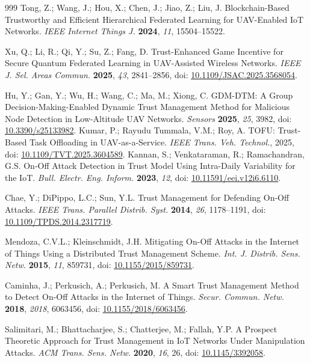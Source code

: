 \documentclass[notspecified,article,submit,moreauthors]{Definitions/mdpi}
\begin{document}
\begin{thebibliography}{999}
Tong, Z.; Wang, J.; Hou, X.; Chen, J.; Jiao, Z.; Liu, J. Blockchain-Based Trustworthy and Efficient Hierarchical Federated Learning for UAV-Enabled IoT Networks. {\em IEEE Internet Things J.} {\bf 2024}, {\em 11}, 15504--15522.

Xu, Q.; Li, R.; Qi, Y.; Su, Z.; Fang, D. Trust-Enhanced Game Incentive for Secure Quantum Federated Learning in UAV-Assisted Wireless Networks. {\em IEEE J. Sel. Areas Commun.} {\bf 2025}, {\em 43}, 2841--2856, doi: \href{https://doi.org/10.1109/JSAC.2025.3568054}{10.1109/JSAC.2025.3568054}.

Hu, Y.; Gan, Y.; Wu, H.; Wang, C.; Ma, M.; Xiong, C. GDM-DTM: A Group Decision-Making-Enabled Dynamic Trust Management Method for Malicious Node Detection in Low-Altitude UAV Networks. {\em Sensors} {\bf 2025}, {\em 25}, 3982, doi: \href{https://doi.org/10.3390/s25133982}{10.3390/s25133982}.
Kumar, P.; Rayudu Tummala, V.M.; Roy, A. TOFU: Trust-Based Task Offloading in UAV-as-a-Service. {\em IEEE Trans. Veh. Technol.}, 2025, doi: \href{https://doi.org/10.1109/TVT.2025.3604589}{10.1109/TVT.2025.3604589}.
Kannan, S.; Venkataraman, R.; Ramachandran, G.S. On-Off Attack Detection in Trust Model Using Intra-Daily Variability for the IoT. {\em Bull. Electr. Eng. Inform.} {\bf 2023}, {\em 12}, doi: \href{https://doi.org/10.11591/eei.v12i6.6110}{10.11591/eei.v12i6.6110}.

Chae, Y.; DiPippo, L.C.; Sun, Y.L. Trust Management for Defending On-Off Attacks. {\em IEEE Trans. Parallel Distrib. Syst.} {\bf 2014}, {\em 26}, 1178--1191, doi: \href{https://doi.org/10.1109/TPDS.2014.2317719}{10.1109/TPDS.2014.2317719}.

Mendoza, C.V.L.; Kleinschmidt, J.H. Mitigating On-Off Attacks in the Internet of Things Using a Distributed Trust Management Scheme. {\em Int. J. Distrib. Sens. Netw.} {\bf 2015}, {\em 11}, 859731, doi: \href{https://doi.org/10.1155/2015/859731}{10.1155/2015/859731}.

Caminha, J.; Perkusich, A.; Perkusich, M. A Smart Trust Management Method to Detect On-Off Attacks in the Internet of Things. {\em Secur. Commun. Netw.} {\bf 2018}, {\em 2018}, 6063456, doi: \href{https://doi.org/10.1155/2018/6063456}{10.1155/2018/6063456}.

Salimitari, M.; Bhattacharjee, S.; Chatterjee, M.; Fallah, Y.P. A Prospect Theoretic Approach for Trust Management in IoT Networks Under Manipulation Attacks. {\em ACM Trans. Sens. Netw.} {\bf 2020}, {\em 16}, 26, doi: \href{https://doi.org/10.1145/3392058}{10.1145/3392058}.


\end{thebibliography}
\end{document}
